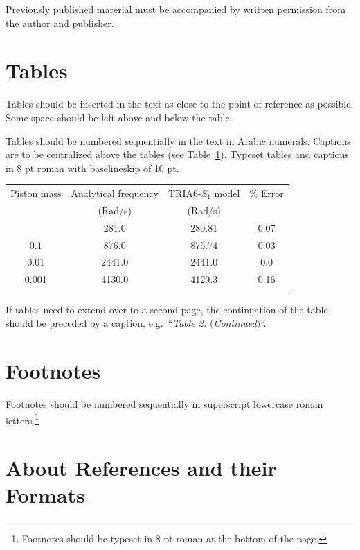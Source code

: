 \documentclass{ws-ijmpa}
\begin{document}
Previously published material must be accompanied by written
permission from the author and publisher.

\section{Tables}

Tables should be inserted in the text as close to the point of
reference as possible. Some space should be left above and below
the table.

Tables should be numbered sequentially in the text in Arabic
numerals. Captions are to be centralized above the tables (see
Table~\ref{ta1}).  Typeset tables and captions in 8 pt roman with
baselineskip of 10 pt.

\begin{table}[ph]
{\begin{tabular}{@{}cccc@{}} \toprule
Piston mass & Analytical frequency & TRIA6-$S_1$ model &
\% Error \\
& (Rad/s) & (Rad/s) \\ \colrule
1.0\hphantom{00} & \hphantom{0}281.0 & \hphantom{0}280.81 & 0.07 \\
0.1\hphantom{00} & \hphantom{0}876.0 & \hphantom{0}875.74 & 0.03 \\
0.01\hphantom{0} & 2441.0 & 2441.0\hphantom{0} & 0.0\hphantom{0} \\
0.001 & 4130.0 & 4129.3\hphantom{0} & 0.16\\ \botrule
\end{tabular} \label{ta1}}
\end{table}

If tables need to extend over to a second page, the continuation of
the table should be preceded by a caption, e.g.~``{\it Table 2.}
$(${\it Continued}$)$''.

\section{Footnotes}

Footnotes should be numbered sequentially in superscript
lowercase roman letters.\footnote{Footnotes should be
typeset in 8 pt roman at the bottom of the page.}

\section{About References and their Formats}
\end{document}
